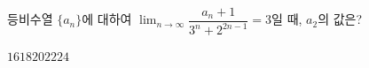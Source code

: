 등비수열 $\{a_n\}$에 대하여 $\displaystyle\lim_{n\to\infty}\dfrac{a_n+1}{3^n+2^{2n-1}}=3$일 때, $a_2$의 값은?
\begin{choices32}{$16$}{$18$}{$20$}{$22$}{$24$}\end{choices32}
